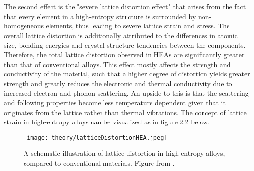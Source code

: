 The second effect is the "severe lattice distortion effect" that arises from the fact that every element in a high-entropy structure is surrounded by non-homogeneous elements, thus leading to severe lattice strain and stress. The overall lattice distortion is additionally attributed to the differences in atomic size, bonding energies and crystal structure tendencies between the components. Therefore, the total lattice distortion observed in HEAs are significantly greater than that of conventional alloys. This effect mostly affects the strength and conductivity of the material, such that a higher degree of distortion yields greater strength and greatly reduces the electronic and thermal conductivity due to increased electron and phonon scattering. An upside to this is that the scattering and following properties become less temperature dependent given that it originates from the lattice rather than thermal vibrations. The concept of lattice strain in high-entropy alloys can be visualized as in figure 2.2 below. 

\begin{figure} 
\centering
\texttt{[image: theory/latticeDistortionHEA.jpeg]}
\caption{A schematic illustration of lattice distortion in high-entropy alloys, compared to conventional materials. Figure from \cite{owen_jones_2018}.}
\end{figure}
 
